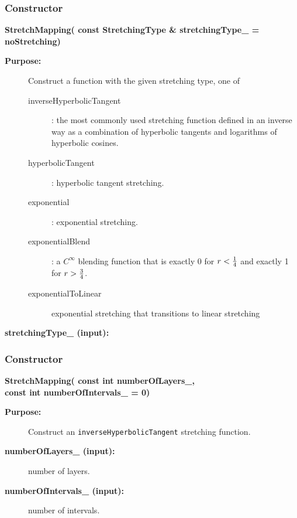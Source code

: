 \subsubsection{Constructor}
 
\newlength{\StretchMappingIncludeArgIndent}
\begin{flushleft} \textbf{%
\settowidth{\StretchMappingIncludeArgIndent}{StretchMapping(}%
StretchMapping( const StretchingType \& stretchingType\_  = noStretching)
}\end{flushleft}
\begin{description}
\item[{\bf Purpose:}]  Construct a function with the given stretching type, one of
  \begin{description}
   \item[inverseHyperbolicTangent] : the most commonly used stretching function
      defined in an inverse way as a combination of hyperbolic tangents and
      logarithms of hyperbolic cosines.
   \item[hyperbolicTangent] : hyperbolic tangent stretching.
   \item[exponential] : exponential stretching.
   \item[exponentialBlend] : a $C^\infty$ blending function that is exactly 0 for $r<{1\over4}$
        and exactly 1 for $r>{3\over4}$.
   \item[exponentialToLinear] exponential stretching that transitions to linear stretching
  \end{description}
\item[{\bf stretchingType\_ (input):}] 
\end{description}
\subsubsection{Constructor}
 
\begin{flushleft} \textbf{%
\settowidth{\StretchMappingIncludeArgIndent}{StretchMapping(}%
StretchMapping( const int numberOfLayers\_, \\ 
\hspace{\StretchMappingIncludeArgIndent}const int numberOfIntervals\_  = 0) 
}\end{flushleft}
\begin{description}
\item[{\bf Purpose:}]  Construct an {\tt inverseHyperbolicTangent} stretching function.
\item[{\bf numberOfLayers\_ (input):}]  number of layers.
\item[{\bf numberOfIntervals\_ (input):}]  number of intervals.
\end{description}
